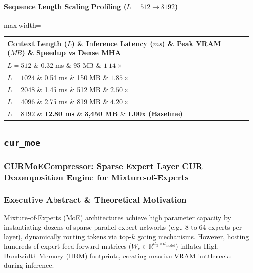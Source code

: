 \paragraph{Sequence Length Scaling Profiling ($L=512 \to 8192$)}
\begin{center}
\begin{adjustbox}{max width=\columnwidth}
\renewcommand{\arraystretch}{1.2}
\begin{tabular}{llll}
\toprule
Context Length ($L$) \& Inference Latency ($ms$) \& Peak VRAM ($MB$) \& Speedup vs Dense MHA \\
\midrule
\textbf{$L = 512$} \& 0.32 ms \& 95 MB \& $1.14\times$ \\
\textbf{$L = 1024$} \& 0.54 ms \& 150 MB \& $1.85\times$ \\
\textbf{$L = 2048$} \& 1.45 ms \& 512 MB \& $2.50\times$ \\
\textbf{$L = 4096$} \& 2.75 ms \& 819 MB \& $4.20\times$ \\
\textbf{$L = 8192$} \& \textbf{12.80 ms} \& \textbf{3,450 MB} \& \textbf{1.00x (Baseline)} \\


\bottomrule
\end{tabular}
\end{adjustbox}
\end{center}

\subsection{\texttt{cur\_moe}}
\subsubsection*{CURMoECompressor: Sparse Expert Layer CUR Decomposition Engine for Mixture-of-Experts}

\subsubsection*{Executive Abstract \& Theoretical Motivation}
Mixture-of-Experts (MoE) architectures achieve high parameter capacity by instantiating dozens of sparse parallel expert networks (e.g., 8 to 64 experts per layer), dynamically routing tokens via top-$k$ gating mechanisms. However, hosting hundreds of expert feed-forward matrices ($W_e \in \mathbb{R}^{d_{\text{ff}} \times d_{\text{model}}}$) inflates High Bandwidth Memory (HBM) footprints, creating massive VRAM bottlenecks during inference.

